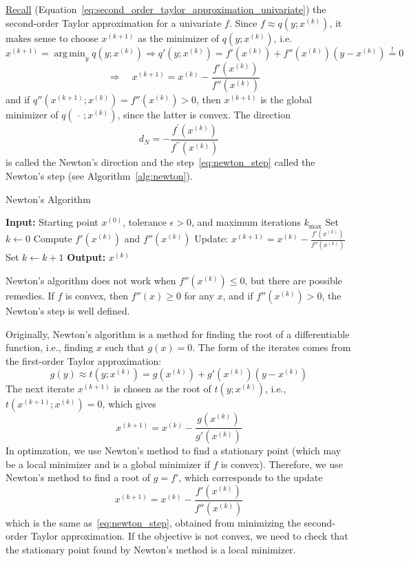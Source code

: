 \documentclass[9pt, headings=standardclasses, parskip=half]{scrartcl}
\DeclareMathOperator*{\argmin}{arg\,min}
\renewcommand{\emph}[1]{\textcolor{mypurple}{#1}}
\begin{document}
\hyperref[eq:second_order_taylor_approximation_univariate]{Recall} (Equation~\ref{eq:second_order_taylor_approximation_univariate}) the second-order Taylor approximation for a univariate \(f\). 
Since \(f \approx q(y;x^{(k)})\), it makes sense to choose \(x^{(k+1)}\) as the minimizer of \(q(y;x^{(k)})\), i.e.
\[
x^{(k+1)}=\argmin_{y} q(y;x^{(k)}) \hyperref[thm:nec_first_order_optimality_univariate]{\Rightarrow} q'(y;x^{(k)}) = f'(x^{(k)})+f''(x^{(k)})(y-x^{(k)}) \overset{!}{=} 0 
\]
\begin{equation}\label{eq:newton_step}
\quad \Longrightarrow \quad x^{(k+1)}=x^{(k)}-\frac{f'(x^{(k)})}{f''(x^{(k)})} %
\end{equation}
and if \(q''(x^{(k+1)};x^{(k)}) = f''(x^{(k)}) > 0\), then \(x^{(k+1)}\) is the global minimizer of \(q(\, \cdot \,; x^{(k)})\), since the latter is convex. 
The direction
\[
d_{N}=-\frac{f^{\prime}\left(x^{(k)}\right)}{f^{\prime \prime}\left(x^{(k)}\right)}
\]
is called the Newton's direction and the step~\eqref{eq:newton_step} called the Newton's step (see Algorithm~\ref{alg:newton}).
\begin{algorithm}[H]
\caption{Newton's Algorithm}\label{alg:newton}
\begin{algorithmic}[1]
    \State \textbf{Input:} Starting point \(x^{(0)}\), tolerance \(\epsilon>0\), and maximum iterations \(k_{\max}\)
    \State Set \(k\gets0\)
        \State Compute \(f'(x^{(k)})\) and \(f''(x^{(k)})\)
        \State Update: \(x^{(k+1)}=x^{(k)}-\frac{f'(x^{(k)})}{f''(x^{(k)})}\)
        \State Set \(k\gets k+1\)
    \EndWhile
    \State \textbf{Output:} \(x^{(k)}\)
\end{algorithmic}
\end{algorithm}

\begin{remark}
Newton's algorithm does \emph{not} work when \(f''(x^{(k)}) \leq 0\), but there are possible remedies. If \(f\) is convex, then \(f''(x) \geq 0\) for any \(x\), and if \(f''(x^{(k)})>0\), the Newton's step is well defined.
\end{remark}

\begin{remark}
Originally, Newton's algorithm is a method for finding the root of a differentiable function, i.e., finding \(x\) such that \(g(x)=0\). The form of the iterates comes from the first-order Taylor approximation:
\[
g(y) \approx t(y;x^{(k)})=g(x^{(k)})+g'(x^{(k)})(y-x^{(k)})
\]
The next iterate \(x^{(k+1)}\) is chosen as the root of \(t(y;x^{(k)})\), i.e., \(t(x^{(k+1)};x^{(k)})=0\), which gives
\[
x^{(k+1)}=x^{(k)}-\frac{g(x^{(k)})}{g'(x^{(k)})}
\]
In optimzation, we use Newton's method to find a stationary point (which \emph{may} be a local minimizer and \emph{is} a global minimizer if \(f\) is convex). Therefore, we use Newton's method to find a root of \(g=f'\), which corresponds to the update
\[
x^{(k+1)}=x^{(k)}-\frac{f'(x^{(k)})}{f''(x^{(k)})}
\]
which is the same as~\eqref{eq:newton_step}, obtained from minimizing the second-order Taylor approximation. If the objective is not convex, we need to check that the stationary point found by Newton's method is a local minimizer.
\end{remark}
\end{document}
